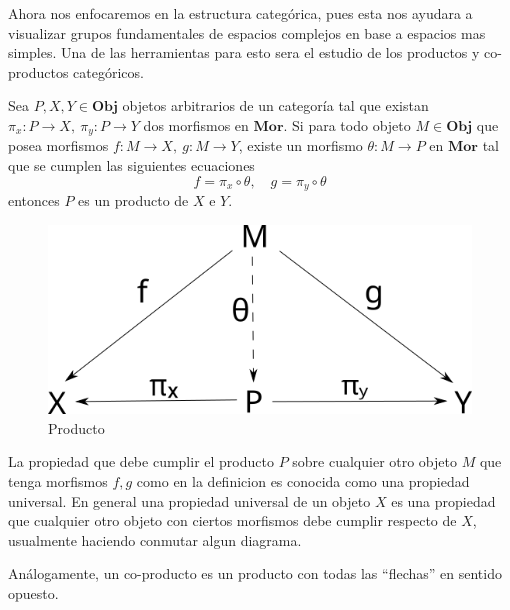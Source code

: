 Ahora nos enfocaremos en la estructura categórica, pues esta nos ayudara
a visualizar grupos fundamentales de espacios complejos en base a
espacios mas simples. Una de las herramientas para esto sera el estudio
de los productos y co-productos categóricos.

\begin{definicion}[Producto]
  Sea \(P , X , Y \in \mathbf {Obj}\) objetos arbitrarios de un categoría
  tal que existan \(\pi_x : P \to X,\ \pi_y : P \to Y\) dos morfismos en
  \(\mathbf {Mor}\). Si para todo objeto \(M \in \mathbf {Obj}\) que
  posea morfismos \( f : M \to X,\ g : M \to Y\), existe un morfismo
  \(\theta : M \to P\) en \(\mathbf{Mor}\) tal que se cumplen las
  siguientes ecuaciones
  \[ f = \pi_x \circ \theta, \quad g = \pi_y \circ \theta \]
  entonces \(P\) es un producto de \(X\) e \(Y\).
  \begin{figure}[h]
    \centering
    \includegraphics[scale=0.5]{./imagenes/producto.png}
    \caption{Producto}
  \end{figure}
\end{definicion}
\begin{acotacion}
  La propiedad que debe cumplir el producto \(P\) sobre cualquier otro
  objeto \(M\) que tenga morfismos \(f,g\) como en la definicion es
  conocida como una propiedad universal. En general una propiedad
  universal de un objeto \(X\) es una propiedad que cualquier otro objeto
  con ciertos morfismos debe cumplir respecto de \(X\), usualmente
  haciendo conmutar algun diagrama.
\end{acotacion}
Análogamente, un co-producto es un producto con todas las ``flechas'' en
sentido opuesto.
